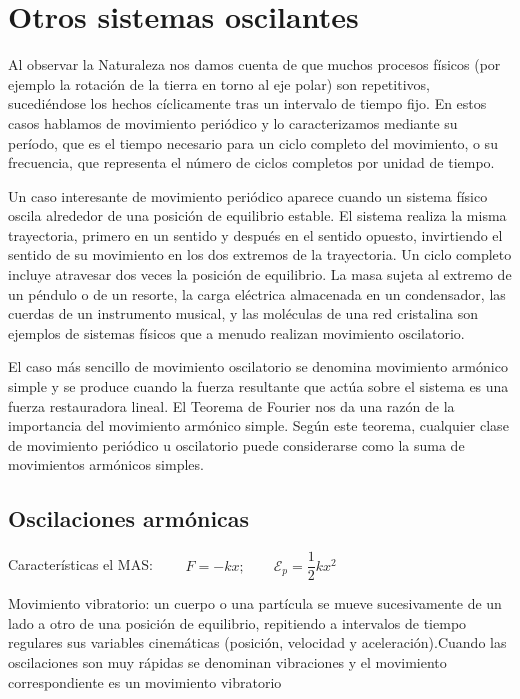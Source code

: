 \chapter{Otros sistemas oscilantes}

\vspace{-5mm}%
\begin{miparrafo}
	\small{Al observar la Naturaleza nos damos cuenta de que muchos procesos físicos (por ejemplo la rotación de la tierra en torno al eje polar) son repetitivos, sucediéndose los hechos cíclicamente tras un intervalo de tiempo fijo. En estos casos hablamos de movimiento periódico y lo caracterizamos mediante su período, que es el tiempo necesario para un ciclo completo del movimiento, o su frecuencia, que representa el número de ciclos completos por unidad de tiempo.}

\small{Un caso interesante de movimiento periódico aparece cuando un sistema físico oscila alrededor de una posición de equilibrio estable. El sistema realiza la misma trayectoria, primero en un sentido y después en el sentido opuesto, invirtiendo el sentido de su movimiento en los dos extremos de la trayectoria. Un ciclo completo incluye atravesar dos veces la posición de equilibrio. La masa sujeta al extremo de un péndulo o de un resorte, la carga eléctrica almacenada en un condensador, las cuerdas de un instrumento musical, y las moléculas de una red cristalina son ejemplos de sistemas físicos que a menudo realizan movimiento oscilatorio.}

\small{El caso más sencillo de movimiento oscilatorio se denomina movimiento armónico simple y se produce cuando la fuerza resultante que actúa sobre el sistema es una fuerza restauradora lineal. El Teorema de Fourier nos da una razón de la importancia del movimiento armónico simple. Según este teorema, cualquier clase de movimiento periódico u oscilatorio puede considerarse como la suma de movimientos armónicos simples}\normalsize{.}
\end{miparrafo}


\section{Oscilaciones armónicas}

Características el MAS: $\qquad F=-kx;\qquad \mathcal E_p=\dfrac 1 2 k x^2$

Movimiento vibratorio: un cuerpo o una partícula se mueve sucesivamente de un lado a otro de una posición de equilibrio, repitiendo a intervalos de tiempo regulares sus variables cinemáticas (posición, velocidad y aceleración).Cuando las oscilaciones son muy rápidas se denominan vibraciones y el movimiento correspondiente es un movimiento vibratorio

